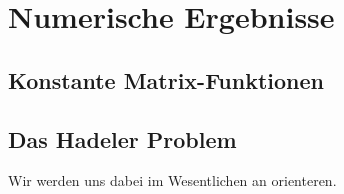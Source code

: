 \section{Numerische Ergebnisse}

\subsection{Konstante Matrix-Funktionen}

\subsection{Das Hadeler Problem}

Wir werden uns dabei im Wesentlichen an \cite{saad2020rational} orienteren.
